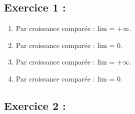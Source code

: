 \documentclass[12pt,a4paper]{article}
\begin{document}
\subsection*{Exercice 1 :}

\begin{enumerate}
    \item Par croissance comparée : lim = $+\infty$.
    \item Par croissance comparée : lim = $0$.
    \item Par croissance comparée : lim = $+\infty$.
    \item Par croissance comparée : lim = $0$.
\end{enumerate}


\subsection*{Exercice 2 :}
\end{document}
